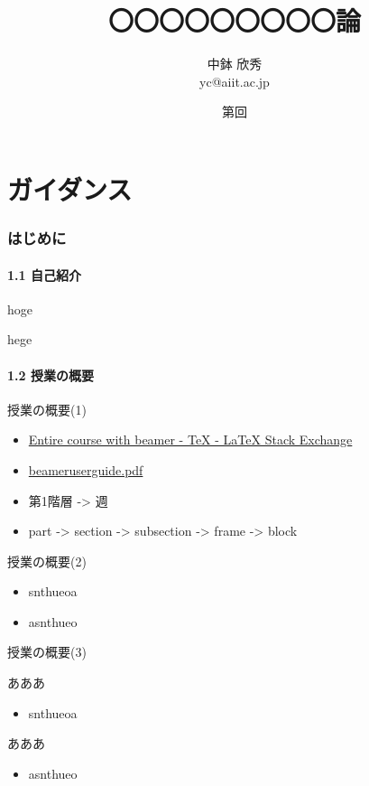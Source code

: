 \documentclass[t]{beamer}
\date{第{\insertpartnumber}回 \insertpart}
\institute[AIIT]{産業技術大学院大学(AIIT)}
\author{中鉢 欣秀 \\ yc@aiit.ac.jp}
\date{}
\title{〇〇〇〇〇〇〇〇〇論}
\begin{document}
\maketitle

\part{ガイダンス}
\label{sec-1}
\section{はじめに}
\label{sec-1-1}
\subsection{1.1 自己紹介}
\label{sec-1-1-1}
\begin{frame}[label=sec-1-1-1-1]{hoge}
\end{frame}
\begin{frame}[label=sec-1-1-1-2]{hege}
\end{frame}
\subsection{1.2 授業の概要}
\label{sec-1-1-2}
\begin{frame}[label=sec-1-1-2-1]{授業の概要(1)}
\begin{itemize}
\item \href{http://tex.stackexchange.com/questions/52900/entire-course-with-beamer}{Entire course with beamer - \TeX{} - \LaTeX{} Stack Exchange}
\item \href{http://ctan.megagod.net/tex-archive/macros/latex/contrib/beamer/doc/beameruserguide.pdf}{beameruserguide.pdf}
\item 第1階層 -> 週
\item part -> section -> subsection -> frame -> block
\end{itemize}
\end{frame}
\begin{frame}[label=sec-1-1-2-2]{授業の概要(2)}
\begin{itemize}
\item snthueoa
\item asnthueo
\end{itemize}
\end{frame}
\begin{frame}[label=sec-1-1-2-3]{授業の概要(3)}
\begin{block}{あああ}
\begin{itemize}
\item snthueoa
\end{itemize}
\end{block}
\begin{block}{あああ}
\begin{itemize}
\item asnthueo
\end{itemize}
\end{block}
\end{frame}
\end{document}
